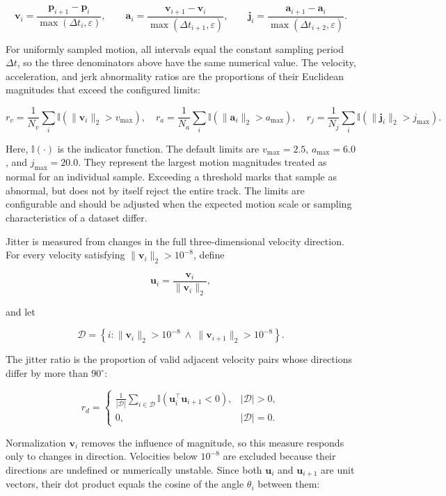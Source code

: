 \documentclass[11pt,oneside]{report}
\begin{document}
\[
\mathbf{v}_i =
\frac{\mathbf{p}_{i+1}-\mathbf{p}_i}
{\max(\Delta t_i,\varepsilon)},
\qquad
\mathbf{a}_i =
\frac{\mathbf{v}_{i+1}-\mathbf{v}_i}
{\max(\Delta t_{i+1},\varepsilon)},
\qquad
\mathbf{j}_i =
\frac{\mathbf{a}_{i+1}-\mathbf{a}_i}
{\max(\Delta t_{i+2},\varepsilon)}.
\]

For uniformly sampled motion, all intervals equal the constant sampling period $\Delta t$, so the three denominators above have the same numerical value. The velocity, acceleration, and jerk abnormality ratios are the proportions of their Euclidean magnitudes that exceed the configured limits:

\[
r_v =
\frac{1}{N_v}\sum_i
\mathbb{I}\!\left(\lVert\mathbf{v}_i\rVert_2>v_{\max}\right),
\quad
r_a =
\frac{1}{N_a}\sum_i
\mathbb{I}\!\left(\lVert\mathbf{a}_i\rVert_2>a_{\max}\right),
\quad
r_j =
\frac{1}{N_j}\sum_i
\mathbb{I}\!\left(\lVert\mathbf{j}_i\rVert_2>j_{\max}\right).
\]

Here, $\mathbb{I}(\cdot)$ is the indicator function. The default limits are $v_{\max}=2.5$, $a_{\max}=6.0$, and $j_{\max}=20.0$. They represent the largest motion magnitudes treated as normal for an individual sample. Exceeding a threshold marks that sample as abnormal, but does not by itself reject the entire track. The limits are configurable and should be adjusted when the expected motion scale or sampling characteristics of a dataset differ.

Jitter is measured from changes in the full three-dimensional velocity direction. For every velocity satisfying $\lVert\mathbf{v}_i\rVert_2>10^{-8}$, define

\[
\mathbf{u}_i =
\frac{\mathbf{v}_i}{\lVert\mathbf{v}_i\rVert_2},
\]

and let

\[
\mathcal{D} =
\left\{
i:
\lVert\mathbf{v}_i\rVert_2>10^{-8}
\ \land\
\lVert\mathbf{v}_{i+1}\rVert_2>10^{-8}
\right\}.
\]

The jitter ratio is the proportion of valid adjacent velocity pairs whose
directions differ by more than $90^\circ$:

\[
r_d =
\begin{cases}
\displaystyle
\frac{1}{|\mathcal{D}|}
\sum_{i\in\mathcal{D}}
\mathbb{I}\!\left(
\mathbf{u}_i^\top\mathbf{u}_{i+1}<0
\right),
& |\mathcal{D}|>0, \\[6pt]
0,
& |\mathcal{D}|=0.
\end{cases}
\]

Normalization $\mathbf{v}_i$ removes the influence of magnitude, so this measure responds only to changes in direction. Velocities below $10^{-8}$ are excluded because their directions are undefined or numerically unstable. Since both $\mathbf{u}_i$ and $\mathbf{u}_{i+1}$ are unit vectors, their dot product equals the cosine of the angle $\theta_i$ between them:
\end{document}
